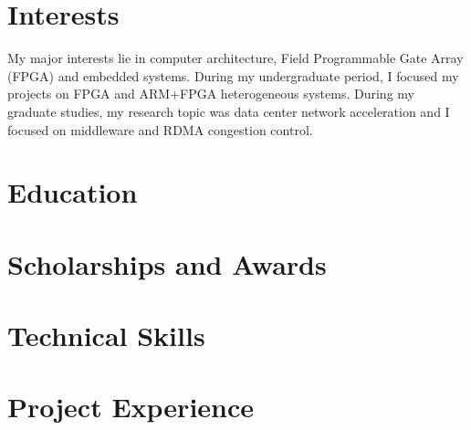 \documentclass[11pt,a4paper]{moderncv}
\begin{document}
\renewcommand{\refname}{Publication}
\maketitle

\section{Interests}
\cvline{}
{
	My major interests lie in computer architecture, Field Programmable Gate Array (FPGA) and embedded systems.
	\newline
	During my undergraduate period, I focused my projects on FPGA and ARM+FPGA heterogeneous systems.
	\newline
	During my graduate studies, my research topic was data center network acceleration and I focused on middleware and RDMA congestion control.
}
\section{Education}

\section{Scholarships and Awards}


\section{Technical Skills}

\section{Project Experience}
\end{document}
